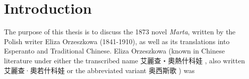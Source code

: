 \chapter{Introduction}

The purpose of this thesis is to discuss the 1873 novel \textit{Marta}, written by the Polish writer Eliza Orzeszkowa (1841-1910), as well as its translations into Esperanto and Traditional Chinese.
Eliza Orzeszkowa (known in Chinese literature under either the transcribed name 艾麗查・奧熱什科娃 , also written 艾麗查·奧若什科娃  or the abbreviated variant 奥西斯歌 ) was 